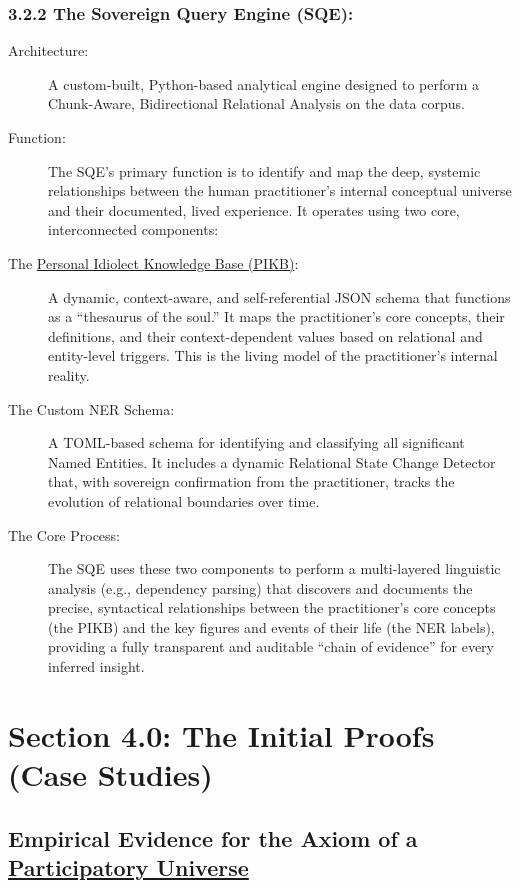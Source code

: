 \documentclass{article}
\begin{document}
\subsubsection*{3.2.2 The Sovereign Query Engine (SQE):}
\begin{description}
    \item[Architecture:] A custom-built, Python-based analytical engine designed to perform a Chunk-Aware, Bidirectional Relational Analysis on the data corpus.
    \item[Function:] The SQE's primary function is to identify and map the deep, systemic relationships between the human practitioner's internal conceptual universe and their documented, lived experience. It operates using two core, interconnected components:
    \item[The \hyperlink{gloss:pibk}{Personal Idiolect Knowledge Base (PIKB)}:] A dynamic, context-aware, and self-referential JSON schema that functions as a ``thesaurus of the soul.'' It maps the practitioner's core concepts, their definitions, and their context-dependent values based on relational and entity-level triggers. This is the living model of the practitioner's internal reality.
    \item[The Custom NER Schema:] A TOML-based schema for identifying and classifying all significant Named Entities. It includes a dynamic Relational State Change Detector that, with sovereign confirmation from the practitioner, tracks the evolution of relational boundaries over time.
    \item[The Core Process:] The SQE uses these two components to perform a multi-layered linguistic analysis (e.g., dependency parsing) that discovers and documents the precise, syntactical relationships between the practitioner's core concepts (the PIKB) and the key figures and events of their life (the NER labels), providing a fully transparent and auditable ``chain of evidence'' for every inferred insight.
\end{description}


\section*{Section 4.0: The Initial Proofs (Case Studies)}
\subsection*{Empirical Evidence for the Axiom of a \hyperlink{gloss:participatory_universe}{Participatory Universe}}
\end{document}
